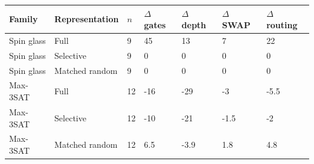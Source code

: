 \begin{tabular}{lllllll}
\hline
Family & Representation & $n$ & $\Delta$ gates & $\Delta$ depth & $\Delta$ SWAP & $\Delta$ routing \\
\hline
Spin glass & Full & 9 & 45 & 13 & 7 & 22 \\
Spin glass & Selective & 9 & 0 & 0 & 0 & 0 \\
Spin glass & Matched random & 9 & 0 & 0 & 0 & 0 \\
Max-3SAT & Full & 12 & -16 & -29 & -3 & -5.5 \\
Max-3SAT & Selective & 12 & -10 & -21 & -1.5 & -2 \\
Max-3SAT & Matched random & 12 & 6.5 & -3.9 & 1.8 & 4.8 \\
\hline
\end{tabular}
